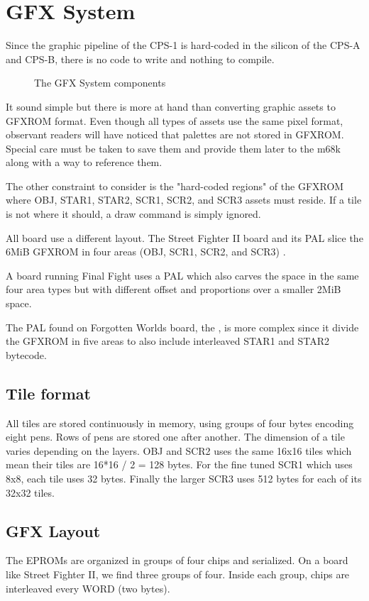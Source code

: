 \chapter{GFX System}
Since the graphic pipeline of the CPS-1 is hard-coded in the silicon of the CPS-A and CPS-B, there is no code to write and nothing to compile. 

\begin{figure}[H]
\caption*{The GFX System components}
\end{figure}

It sound simple but there is more at hand than converting graphic assets to GFXROM format. Even though all types of assets use the same pixel format, observant readers will have noticed that palettes are not stored in GFXROM. Special care must be taken to save them and provide them later to the m68k along with a way to reference them.

The other constraint to consider is the "hard-coded regions" of the GFXROM where OBJ, STAR1, STAR2, SCR1, SCR2, and SCR3 assets must reside. If a tile is not where it should, a draw command is simply ignored.

All board use a different layout. The Street Fighter II board and its  PAL slice the 6MiB GFXROM in four areas (OBJ, SCR1, SCR2, and SCR3) . 

A board running Final Fight uses a  PAL which also carves the space in the same four area types but with different offset and proportions over a smaller 2MiB space. 

The PAL found on Forgotten Worlds board, the , is more complex since it divide the GFXROM in five areas to also include interleaved STAR1 and STAR2 bytecode.


\section{Tile format}
All tiles are stored continuously in memory, using groups of four bytes encoding eight pens. Rows of pens are stored one after another. The dimension of a tile varies depending on the layers. OBJ and SCR2 uses the same 16x16 tiles which mean their tiles are 16*16 / 2 = 128 bytes. For the fine tuned SCR1 which uses 8x8, each tile uses 32 bytes. Finally the larger SCR3 uses 512 bytes for each of its 32x32 tiles.

\section{GFX Layout}
The EPROMs are organized in groups of four chips and serialized. On a board like Street Fighter II, we find three groups of four. Inside each group, chips are interleaved every WORD (two bytes).

